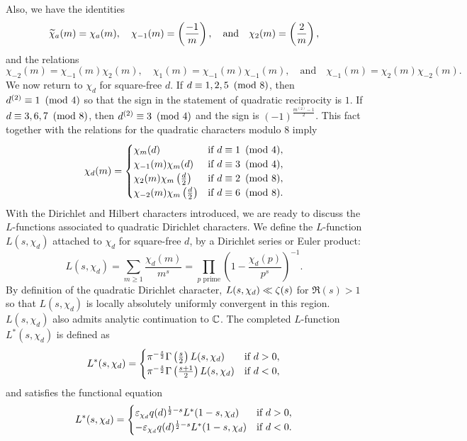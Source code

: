\documentclass[12pt,reqno,oneside]{amsart}
\begin{document}
    Also, we have the identities
    \[
        \widetilde{\chi}_{a}(m) = \chi_{a}(m), \quad \chi_{-1}(m) = \left(\frac{-1}{m}\right), \quad \text{and} \quad \chi_{2}(m) = \left(\frac{2}{m}\right),
    \]
    and the relations
    \[
        \chi_{-2}(m) = \chi_{-1}(m)\chi_{2}(m), \quad \chi_{1}(m) = \chi_{-1}(m)\chi_{-1}(m), \quad \text{and} \quad \chi_{-1}(m) = \chi_{2}(m)\chi_{-2}(m).
    \]
    We now return to $\chi_{d}$ for square-free $d$. If $d \equiv 1,2,5 \ \left(\text{mod }8\right)$, then $d^{(2)} \equiv 1 \ \left(\text{mod }4\right)$ so that the sign in the statement of quadratic reciprocity is $1$. If $d \equiv 3,6,7 \ \left(\text{mod }8\right)$, then $d^{(2)} \equiv 3 \ \left(\text{mod }4\right)$ and the sign is $(-1)^{\frac{m^{(2)}-1}{2}}$. This fact together with the relations for the quadratic characters modulo $8$ imply
    \[
        \chi_{d}(m) = \begin{cases} \chi_{m}(d) & \text{if $d \equiv 1 \ \left(\text{mod }4\right)$}, \\ \chi_{-1}(m)\chi_{m}(d) & \text{if $d \equiv 3 \ \left(\text{mod }4\right)$}, \\ \chi_{2}(m)\chi_{m}\left(\frac{d}{2}\right) & \text{if $d \equiv 2 \ \left(\text{mod }8\right)$}, \\ \chi_{-2}(m)\chi_{m}\left(\frac{d}{2}\right) & \text{if $d \equiv 6 \ \left(\text{mod }8\right)$}. \end{cases}
    \]
    With the Dirichlet and Hilbert characters introduced, we are ready to discuss the $L$-functions associated to quadratic Dirichlet characters. We define the $L$-function $L(s,\chi_{d})$ attached to $\chi_{d}$ for square-free $d$, by a Dirichlet series or Euler product:
    \[
        L(s,\chi_{d}) = \sum_{m \ge 1}\frac{\chi_{d}(m)}{m^{s}} = \prod_{p \text{ prime}}\left(1-\frac{\chi_{d}(p)}{p^{s}}\right)^{-1}.
    \]
    By definition of the quadratic Dirichlet character, $L(s,\chi_{d}) \ll \zeta(s)$ for $\Re(s) > 1$ so that $L(s,\chi_{d})$ is locally absolutely uniformly convergent in this region. $L(s,\chi_{d})$ also admits analytic continuation to $\mathbb{C}$. The completed $L$-function $L^{\ast}(s,\chi_{d})$ is defined as
    \[
        L^{\ast}(s,\chi_{d}) = \begin{cases} \pi^{-\frac{s}{2}}\Gamma\left(\frac{s}{2}\right)L(s,\chi_{d}) & \text{if $d > 0$}, \\ \pi^{-\frac{s}{2}}\Gamma\left(\frac{s+1}{2}\right)L(s,\chi_{d}) & \text{if $d < 0$}, \end{cases}
    \]
    and satisfies the functional equation
    \[
        L^{\ast}(s,\chi_{d}) = \begin{cases} \varepsilon_{\chi_{d}}q(d)^{\frac{1}{2}-s}L^{\ast}(1-s,\chi_{d}) & \text{if $d > 0$}, \\ -\varepsilon_{\chi_{d}}q(d)^{\frac{1}{2}-s}L^{\ast}(1-s,\chi_{d}) & \text{if $d < 0$}. \end{cases}
    \]
\end{document}
